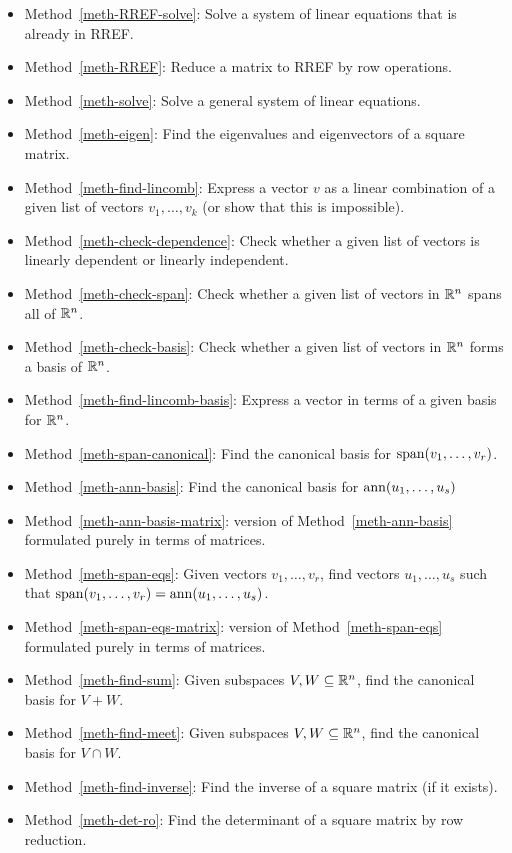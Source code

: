 \documentclass[reqno]{amsart}
\theoremstyle{definition}
\begin{document}
\begin{itemize}
 \item Method~\ref{meth-RREF-solve}:
  Solve a system of linear equations that is already in RREF.
 \item Method~\ref{meth-RREF}:
  Reduce a matrix to RREF by row operations.
 \item Method~\ref{meth-solve}:
  Solve a general system of linear equations.
 \item Method~\ref{meth-eigen}:
  Find the eigenvalues and eigenvectors of a square matrix.
 \item Method~\ref{meth-find-lincomb}:
  Express a vector $v$ as a linear combination of a given list of
  vectors $v_1,\dotsc,v_k$ (or show that this is impossible).
 \item Method~\ref{meth-check-dependence}:
  Check whether a given list of vectors is linearly dependent or
  linearly independent.
 \item Method~\ref{meth-check-span}:
  Check whether a given list of vectors in ${\mathbb{R}}^n$ spans all of ${\mathbb{R}}^n$.
 \item Method~\ref{meth-check-basis}:
  Check whether a given list of vectors in ${\mathbb{R}}^n$ forms a basis of ${\mathbb{R}}^n$.
 \item Method~\ref{meth-find-lincomb-basis}: Express a vector in terms
  of a given basis for ${\mathbb{R}}^n$.
 \item Method~\ref{meth-span-canonical}: Find the canonical basis for
  $\operatorname{span}(v_1,\dotsc,v_r)$.
 \item Method~\ref{meth-ann-basis}: Find the canonical basis for
  $\operatorname{ann}(u_1,\dotsc,u_s)$
 \item Method~\ref{meth-ann-basis-matrix}: version of
  Method~\ref{meth-ann-basis} formulated purely in terms of matrices.
 \item Method~\ref{meth-span-eqs}: Given vectors $v_1,\dotsc,v_r$,
  find vectors $u_1,\dotsc,u_s$ such that
  $\operatorname{span}(v_1,\dotsc,v_r)=\operatorname{ann}(u_1,\dotsc,u_s)$.
 \item Method~\ref{meth-span-eqs-matrix}: version of
  Method~\ref{meth-span-eqs} formulated purely in terms of matrices.
 \item Method~\ref{meth-find-sum}: Given subspaces $V,W\subseteq{\mathbb{R}}^n$, find
  the canonical basis for $V+W$.
 \item Method~\ref{meth-find-meet}: Given subspaces $V,W\subseteq{\mathbb{R}}^n$, find
  the canonical basis for $V\cap W$.
 \item Method~\ref{meth-find-inverse}: Find the inverse of a square
  matrix (if it exists).
 \item Method~\ref{meth-det-ro}: Find the determinant of a square
  matrix by row reduction.
\end{itemize}
\end{document}
